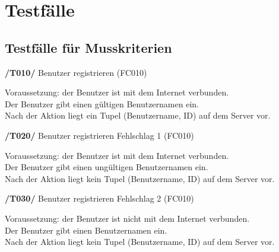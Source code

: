 \section{Testfälle}
\subsection{Testfälle für Musskriterien}

\textbf{/T010/} Benutzer registrieren (FC010) \\
\begin{center}
\vspace{-\parskip}
\begin{minipage}[t]{0.9\textwidth}
Voraussetzung: der Benutzer ist mit dem Internet verbunden.\\
Der Benutzer gibt einen gültigen Benutzernamen ein.\\
Nach der Aktion liegt ein Tupel (Benutzername, ID) auf dem Server vor.\\
\end{minipage}
\end{center}

\textbf{/T020/} Benutzer registrieren Fehlschlag 1 (FC010) \\
\begin{center}
\vspace{-\parskip}
\begin{minipage}[t]{0.9\textwidth}
Voraussetzung: der Benutzer ist mit dem Internet verbunden.            \\
Der Benutzer gibt einen ungültigen Benutzernamen ein.                   \\
Nach der Aktion liegt kein Tupel (Benutzername, ID) auf dem Server vor.  \\
\end{minipage}
\end{center}

\textbf{/T030/} Benutzer registrieren Fehlschlag 2 (FC010) \\
\begin{center}
\vspace{-\parskip}
\begin{minipage}[t]{0.9\textwidth}
Voraussetzung: der Benutzer ist nicht mit dem Internet verbunden.         \\
Der Benutzer gibt einen Benutzernamen ein.                                 \\
Nach der Aktion liegt kein Tupel (Benutzername, ID) auf dem Server vor.     \\
\end{minipage}
\end{center}

